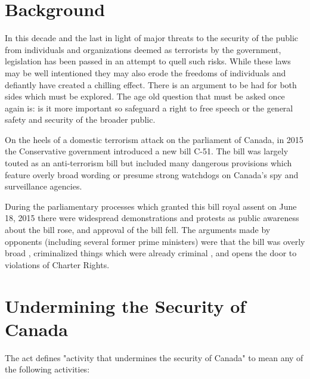 \documentclass[a4paper, 11pt]{article} %
\begin{document}

\section*{Background}
In this decade and the last in light of major threats to the security of the public from individuals and organizations deemed as terrorists by the government, legislation has been passed in an attempt to quell such risks. While these laws may be well intentioned they may also erode the freedoms of individuals and defiantly have created a chilling effect. There is an argument to be had for both sides which must be explored. The age old question that must be asked once again is: is it more important so safeguard a right to free speech or the general safety and security of the broader public.

On the heels of a domestic terrorism attack on the parliament of Canada, in 2015 the Conservative government introduced a new bill C-51. The bill was largely touted as an anti-terrorism bill but included many dangerous provisions which feature overly broad wording or presume strong watchdogs on Canada's spy and surveillance agencies.

During the parliamentary processes which granted this bill royal assent on June 18, 2015 there were widespread demonstrations and protests as public awareness about the bill rose, and approval of the bill fell. \cite{popularity} The arguments made by opponents (including several former prime ministers) were that the bill was overly broad \cite{businesses}, criminalized things which were already criminal \cite{bar}, and opens the door to violations of Charter Rights. \cite{liberty-for-security}


\section*{Undermining the Security of Canada}
The act defines "activity that undermines the security of Canada" to mean any of the following activities:
\end{document}
